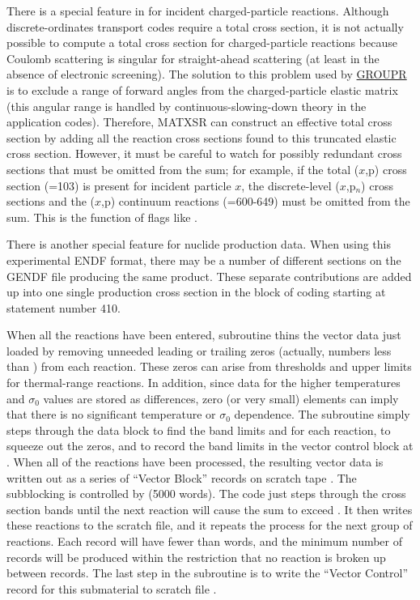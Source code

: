 There is a special feature in  for incident charged-particle
reactions.  Although discrete-ordinates transport codes require a
total cross section, it is not actually possible to compute a
total cross section for charged-particle reactions because Coulomb
scattering is singular for straight-ahead scattering (at least in
the absence of electronic screening).  The solution to this problem
used by \hyperlink{sGROUPRhy}{GROUPR} is to exclude
a range of forward angles from the
charged-particle elastic matrix (this angular range is handled by
continuous-slowing-down theory in the application codes).  Therefore,
MATXSR can construct an effective
total cross section by adding all
the reaction cross sections found to this truncated elastic cross section.
However, it must be careful to watch for possibly redundant
cross sections that must be omitted from the sum; for example, if
the total ($x$,p) cross section (=103) is present
for incident particle
$x$, the discrete-level ($x$,p$_n$) cross sections and the
($x$,p) continuum reactions (=600-649) must be omitted from the sum.
This is the function of flags like .

There is another special feature for nuclide production data.  When
using this experimental ENDF format, there may be a number of different
sections on the GENDF file producing the same product.  These
separate contributions are added up into one single production cross
section in the block of coding starting at statement number 410.

When all the reactions have been entered, subroutine 
thins the vector data just loaded by removing unneeded leading or
trailing zeros (actually, numbers less than ) from
each reaction.  These zeros can arise from thresholds and upper limits
for thermal-range reactions.  In addition, since data for the higher
temperatures and $\sigma_0$ values are stored as differences, zero
(or very small) elements can imply that there is no significant
temperature or $\sigma_0$ dependence.  The subroutine simply steps
through the  data block to find the band limits 
and  for each reaction, to squeeze out the zeros, and to
record the band limits in the vector control block at .
When all of the  reactions have been processed, the resulting
vector data is written out as a series of ``Vector Block'' records on
scratch tape .  The subblocking is controlled by 
(5000 words).  The code just steps through the cross section
bands until the next reaction will cause the sum to exceed .
It then writes these reactions to the scratch file, and it repeats the
process for the next group of reactions.  Each record will have fewer
than  words, and the minimum number of records will be
produced within the restriction that no reaction is broken up between
records.  The last step in the subroutine is to write the ``Vector
Control'' record for this submaterial to scratch file .

